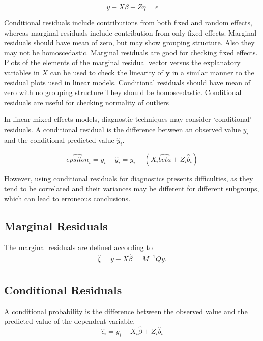 \documentclass[12pt, a4paper]{report}
\theoremstyle{plain}
\theoremstyle{definition}
\theoremstyle{remark}
\begin{document}
	\[y - X\beta - Z \eta = \epsilon \]

	Conditional residuals include contributions from both fixed and random effects, whereas marginal residuals include contribution from only fixed effects. Marginal residuals should have mean of zero, but may show grouping structure. 
Also they may not be homoscedastic. Marginal residuals are good for checking fixed effects.	Plots of the elements of the marginal residual vector versus the explanatory variables in $X$ can be used to check the linearity of $\boldsymbol{y}$ in a similar manner to the residual plots used in linear models.
Conditional residuals should have mean of zero with no grouping structure
They should be homoscedastic. Conditional residuals are useful for checking normality of outliers
	
	
In linear mixed effects models, diagnostic techniques may consider `conditional' residuals. A conditional residual is the difference between an observed value $y_{i}$ and the conditional predicted value $\hat{y}_{i} $.
	
	\[ \hat{epsilon}_{i} = y_{i} - \hat{y}_{i} = y_{i} - ( X_{i}\hat{beta} + Z_{i}\hat{b}_{i}) \]
	
However, using conditional residuals for diagnostics presents difficulties, as they tend to be correlated and their variances may be different for different subgroups, which can lead to erroneous conclusions.


		\subsection{Marginal Residuals}
		The marginal residuals are defined according to
		\begin{eqnarray*}
			\hat{\xi} = y - X\hat{\beta} = M^{-1}Qy. \\\nonumber
		\end{eqnarray*}
		
	
		\subsection{Conditional Residuals}
		A conditional probability is the difference between the observed value and the predicted value of the dependent variable.
		\begin{equation*}
		\hat{\epsilon}_{i} = y_{i} - X_{i}\hat{\beta} + Z_{i}\hat{b}_{i}
		\end{equation*}
		
\end{document}
